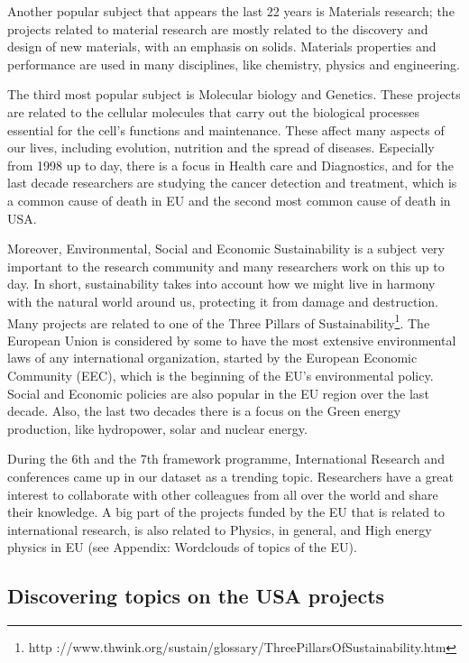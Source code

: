 \documentclass[12pt]{report}
\begin{document}
Another popular subject that appears the last 22 years is Materials research;
the projects related to material research are mostly related to the discovery
and design of new materials, with an emphasis on solids. Materials properties
and performance are used in many disciplines, like chemistry, physics and
engineering.

The third most popular subject is Molecular biology and Genetics. These projects
are related to the cellular molecules that carry out the biological processes
essential for the cell's functions and maintenance. These affect many aspects of
our lives, including evolution, nutrition and the spread of diseases. Especially
from 1998 up to day, there is a focus in Health care and Diagnostics, and for the
last decade researchers are studying the cancer detection and treatment, which
is a common cause of death in EU and the second most common cause of death in
USA.

Moreover, Environmental, Social and Economic Sustainability is a subject very
important to the research community and many researchers work on this up to day.
In short, sustainability takes into account how we might live in harmony with
the natural world around us, protecting it from damage and destruction. Many
projects are related to one of the Three Pillars of Sustainability\footnote{http
://www.thwink.org/sustain/glossary/ThreePillarsOfSustainability.htm}. The
European Union is considered by some to have the most extensive environmental
laws of any international organization, started by the  European Economic
Community (EEC), which is the beginning of the EU's environmental policy. Social
and Economic policies are also popular in the EU region over the last decade.
Also, the last two decades there is a focus on the Green energy production, like
hydropower, solar and nuclear energy.

During the 6th and the 7th framework programme, International Research and
conferences came up in our dataset as a trending topic. Researchers have a great
interest to collaborate with other colleagues from all over the world and share
their knowledge. A big part of the projects funded by the EU that is related to
international research, is also related to Physics, in general, and High energy
physics in EU (see Appendix: Wordclouds of topics of the EU).

\subsection{Discovering topics on the USA projects}
\end{document}
